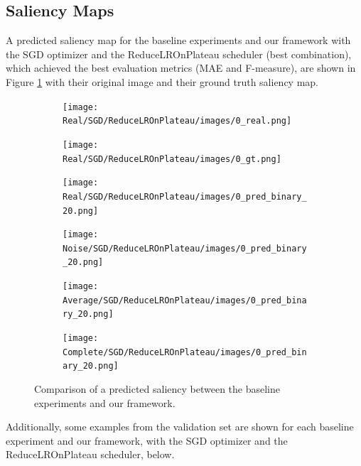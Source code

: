 \documentclass{article}
\begin{document}
\subsection{Saliency Maps}

A predicted saliency map for the baseline experiments and our framework with the SGD optimizer and the ReduceLROnPlateau scheduler (best combination), which achieved the best evaluation metrics (MAE and F-measure), are shown in Figure \ref{fig:comp_images} with their original image and their ground truth saliency map.

\begin{figure}[h]
  \centering
  \begin{subfigure}[c]{0.16\textwidth}
    \centering
      \texttt{[image: Real/SGD/ReduceLROnPlateau/images/0\_real.png]}
  \end{subfigure}
  \begin{subfigure}[c]{0.16\textwidth}
    \centering
      \texttt{[image: Real/SGD/ReduceLROnPlateau/images/0\_gt.png]}
  \end{subfigure}
  \begin{subfigure}[c]{0.16\textwidth}
    \centering
      \texttt{[image: Real/SGD/ReduceLROnPlateau/images/0\_pred\_binary\_20.png]}
  \end{subfigure}
  \begin{subfigure}[c]{0.16\textwidth}
    \centering
    \texttt{[image: Noise/SGD/ReduceLROnPlateau/images/0\_pred\_binary\_20.png]}
  \end{subfigure}
  \begin{subfigure}[c]{0.16\textwidth}
    \centering
    \texttt{[image: Average/SGD/ReduceLROnPlateau/images/0\_pred\_binary\_20.png]}
  \end{subfigure}
  \begin{subfigure}[c]{0.16\textwidth}
    \centering
    \texttt{[image: Complete/SGD/ReduceLROnPlateau/images/0\_pred\_binary\_20.png]}
  \end{subfigure}
  \caption{Comparison of a predicted saliency between the baseline experiments and our framework.}
  \label{fig:comp_images}
\end{figure}

Additionally, some examples from the validation set are shown for each baseline experiment and our framework, with the SGD optimizer and the ReduceLROnPlateau scheduler, below.
\end{document}
